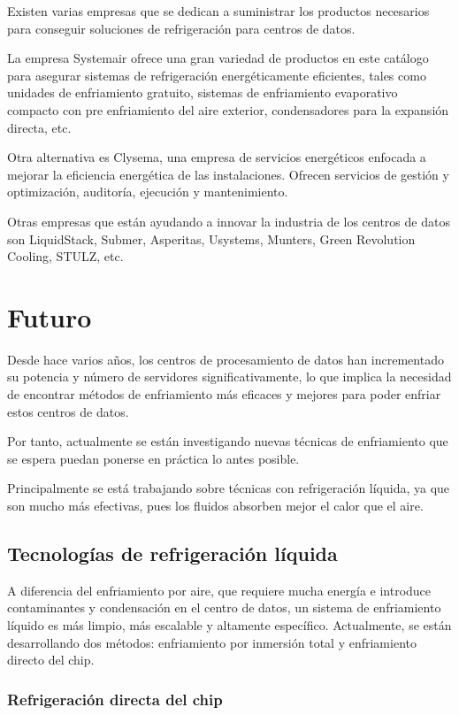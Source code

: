 Existen varias empresas que se dedican a suministrar los productos necesarios para conseguir soluciones de refrigeración para centros de datos.

La empresa Systemair ofrece una gran variedad de productos en este catálogo para asegurar sistemas de refrigeración energéticamente eficientes, tales como unidades de enfriamiento gratuito, sistemas de enfriamiento evaporativo compacto con pre enfriamiento del aire exterior, condensadores para la expansión directa, etc.

Otra alternativa es Clysema, una empresa de servicios energéticos enfocada a mejorar la eficiencia energética de las instalaciones. Ofrecen servicios de gestión y optimización, auditoría, ejecución y mantenimiento.

Otras empresas que están ayudando a innovar la industria de los centros de datos son LiquidStack, Submer, Asperitas, Usystems, Munters, Green Revolution Cooling, STULZ, etc.


\section{Futuro}

Desde hace varios años, los centros de procesamiento de datos han incrementado su potencia y número de servidores significativamente, lo que implica la necesidad de encontrar métodos de enfriamiento más eficaces y mejores para poder enfriar estos centros de datos.

Por tanto, actualmente se están investigando nuevas técnicas de enfriamiento que se espera puedan ponerse en práctica lo antes posible.

Principalmente se está trabajando sobre técnicas con refrigeración líquida, ya que son mucho más efectivas, pues los fluidos absorben mejor el calor que el aire.

\subsection{Tecnologías de refrigeración líquida}

A diferencia del enfriamiento por aire, que requiere mucha energía e introduce contaminantes y condensación en el centro de datos, un sistema de enfriamiento líquido es más limpio, más escalable y altamente específico. Actualmente, se están desarrollando dos métodos: enfriamiento por inmersión total y enfriamiento directo del chip.

\subsubsection{Refrigeración directa del chip}

